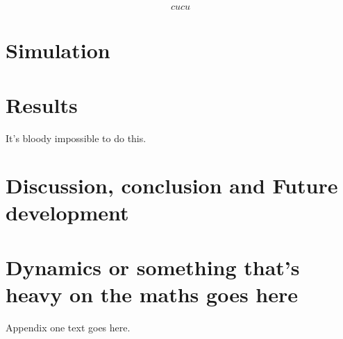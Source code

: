 \documentclass[journal]{IEEEtran}
\begin{document}
	\begin{equation} \label{eq:pot_}
	cucu
	\end{equation}
	
	\section{Simulation}
	
	
	\section{Results}
	It's bloody impossible to do this.
	
	\section{Discussion, conclusion and Future development}
	
	
	
	
	
	
	\appendices
	\section{Dynamics or something that's heavy on the maths goes here}
	Appendix one text goes here.
	
\end{document}
